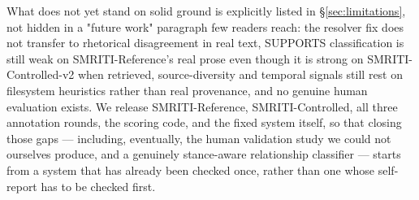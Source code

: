 What does not yet stand on solid ground is explicitly listed in
\S\ref{sec:limitations}, not hidden in a "future work" paragraph few
readers reach: the resolver fix does not transfer to rhetorical
disagreement in real text, SUPPORTS classification is still weak on
SMRITI-Reference's real prose even though it is strong on
SMRITI-Controlled-v2 when retrieved, source-diversity and temporal
signals still rest on filesystem
heuristics rather than real provenance, and no genuine human evaluation
exists. We release SMRITI-Reference, SMRITI-Controlled, all three
annotation rounds, the scoring code, and the fixed system itself, so that closing
those gaps --- including, eventually, the human validation study we could
not ourselves produce, and a genuinely stance-aware relationship
classifier --- starts from a system that has already been checked once,
rather than one whose self-report has to be checked first.
